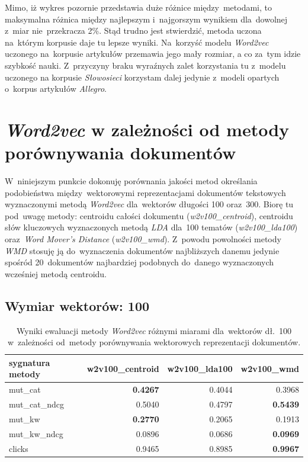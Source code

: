 \documentclass[pl]{minipw} %
\begin{document}
Mimo, iż wykres pozornie przedstawia duże różnice między~metodami, to maksymalna różnica między najlepszym i~najgorszym wynikiem dla~dowolnej z~miar nie~przekracza 2\%. Stąd trudno jest stwierdzić, metoda uczona na~którym korpusie daje tu lepsze wyniki. Na~korzyść modelu \textit{Word2vec} uczonego na~korpusie artykułów przemawia jego mały rozmiar, a co za~tym idzie szybkość nauki. Z~przyczyny braku wyraźnych zalet korzystania tu z~modelu uczonego na korpusie \textit{Słowosieci} korzystam dalej jedynie z~modeli opartych o~korpus artykułów \textit{Allegro}.

\section{\textit{Word2vec} w zależności od metody porównywania dokumentów}

W~niniejszym punkcie dokonuję porównania jakości metod określania podobieństwa między~wektorowymi reprezentacjami dokumentów tekstowych wyznaczonymi metodą \textit{Word2vec} dla~wektorów długości 100 oraz~300. Biorę tu pod~uwagę metody: centroidu całości dokumentu (\textit{w2v100\_centroid}), centroidu słów kluczowych wyznaczonych metodą \textit{LDA} dla~100 tematów (\textit{w2v100\_lda100}) oraz~\textit{Word Mover's Distance} (\textit{w2v100\_wmd}). Z~powodu powolności metody \textit{WMD} stosuję ją do~wyznaczenia dokumentów najbliższych danemu jedynie spośród 20~dokumentów najbardziej podobnych do~danego wyznaczonych wcześniej metodą centroidu.

\subsection{Wymiar wektorów: 100}

\begin{table}[H]
	\centering
	\begin{tabular}{lrrr}
		\hline
		sygnatura metody &   w2v100\_centroid &   w2v100\_lda100 &   w2v100\_wmd \\
		\hline
		mut\_cat      &            \textbf{0.4267} &          0.4044 &       0.3968 \\
		mut\_cat\_ndcg &            0.5040  &          0.4797 &       \textbf{0.5439} \\
		mut\_kw       &            \textbf{0.2770}  &          0.2065 &       0.1913 \\
		mut\_kw\_ndcg  &            0.0896 &          0.0686 &       \textbf{0.0969} \\
		clicks       &            0.9465 &          0.8985 &       \textbf{0.9967} \\
		\hline
	\end{tabular}
	\caption{Wyniki ewaluacji metody \textit{Word2vec} różnymi miarami dla~wektorów dł.~100 w~zależności od~metody porównywania wektorowych reprezentacji dokumentów.}
\end{table}
\end{document}
